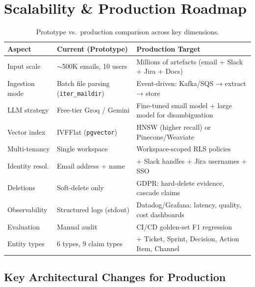 \documentclass[11pt,a4paper]{article}
\newcommand{\code}[1]{\texttt{\small#1}}
\begin{document}
\section{Scalability \& Production Roadmap}

\begin{table}[H]
\centering\small
\begin{tabularx}{\linewidth}{L{3.0cm} L{3.8cm} X}
\toprule
{}
\color{white}\textbf{Aspect} & \color{white}\textbf{Current (Prototype)} & \color{white}\textbf{Production Target} \\
\midrule
Input scale     & $\sim$500K emails, 10 users & Millions of artefacts (email + Slack + Jira + Docs) \\
Ingestion mode  & Batch file parsing (\code{iter\_maildir}) & Event-driven: Kafka/SQS → extract → store \\
LLM strategy    & Free-tier Groq / Gemini & Fine-tuned small model + large model for disambiguation \\
Vector index    & IVFFlat (\code{pgvector}) & HNSW (higher recall) or Pinecone/Weaviate \\
Multi-tenancy   & Single workspace & Workspace-scoped RLS policies \\
Identity resol. & Email address + name & + Slack handles + Jira usernames + SSO \\
Deletions       & Soft-delete only & GDPR: hard-delete evidence, cascade claims \\
Observability   & Structured logs (stdout) & Datadog/Grafana: latency, quality, cost dashboards \\
Evaluation      & Manual audit         & CI/CD golden-set F1 regression \\
Entity types    & 6 types, 9 claim types & + Ticket, Sprint, Decision, Action Item, Channel \\
\bottomrule
\end{tabularx}
\caption{Prototype vs.\ production comparison across key dimensions.}
\end{table}

\subsection*{Key Architectural Changes for Production}
\end{document}
